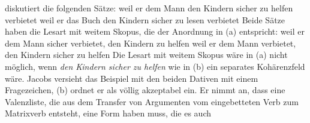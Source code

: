 \citet[]{Jacobs91a} diskutiert die folgenden Sätze:
\eal
\ex{}
weil    er       dem Mann      den Kindern        sicher zu helfen verbietet
\ex
weil    er       das Buch      den Kindern        sicher zu lesen verbietet
\zl
Beide Sätze haben die Lesart mit weitem Skopus, die der Anordnung in (a) entspricht:
\eal
\ex weil er dem Mann sicher verbietet, den Kindern zu helfen
\ex weil er dem Mann verbietet, den Kindern sicher zu helfen
\zl
Die Lesart mit weitem Skopus wäre in (a) nicht möglich, wenn \emph{den Kindern sicher zu
  helfen} wie in (b) ein separates Kohärenzfeld wäre. Jacobs versieht das Beispiel mit den beiden Dativen
mit einem Fragezeichen, (b) ordnet er als völlig akzeptabel ein.
Er nimmt an, dass eine Valenzliste, die aus dem Transfer von Argumenten vom
eingebetteten Verb zum Matrixverb entsteht, eine Form haben muss, die es auch
